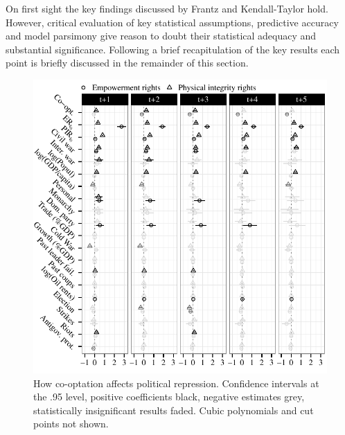On first sight the key findings discussed by Frantz and 
Kendall-Taylor hold. However, critical evaluation of key
statistical assumptions, predictive accuracy and model
parsimony give reason to doubt their statistical adequacy 
and substantial significance. Following a brief recapitulation of the key results each point is briefly discussed in the remainder of this section.

\begin{figure}[!ht]
  \centering
  \includegraphics[width=\linewidth]{./sections/03replication/coefPlotOriginal.pdf}
  \caption{How co-optation affects political repression.
    Confidence intervals at the .95 level, positive 
    coefficients black, negative estimates grey, statistically
    insignificant results faded. Cubic polynomials and 
    cut points not shown.%
  }
  \label{fig:coefPlot}
\end{figure}


